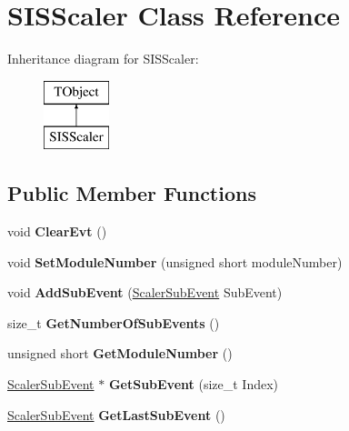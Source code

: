 \hypertarget{class_s_i_s_scaler}{}\section{S\+I\+S\+Scaler Class Reference}
\label{class_s_i_s_scaler}
Inheritance diagram for S\+I\+S\+Scaler\+:\begin{figure}[H]
\begin{center}
\leavevmode
\includegraphics[height=2.000000cm]{class_s_i_s_scaler}
\end{center}
\end{figure}
\subsection*{Public Member Functions}
\begin{DoxyCompactItemize}
\item 
\mbox{\label{class_s_i_s_scaler_a1038e9479e85008d7283bb10d3a0ea52}} 
void {\bfseries Clear\+Evt} ()
\item 
\mbox{\label{class_s_i_s_scaler_a19a3c1b9b24d6dd3f359c25749cca97b}} 
void {\bfseries Set\+Module\+Number} (unsigned short module\+Number)
\item 
\mbox{\label{class_s_i_s_scaler_acd7452d99f825be03e150ca7095e81f2}} 
void {\bfseries Add\+Sub\+Event} (\hyperlink{class_scaler_sub_event}{Scaler\+Sub\+Event} Sub\+Event)
\item 
\mbox{\label{class_s_i_s_scaler_aa0fc0b485191e72ef46ed4fccb9525e1}} 
size\+\_\+t {\bfseries Get\+Number\+Of\+Sub\+Events} ()
\item 
\mbox{\label{class_s_i_s_scaler_aa3c573faebe1e226c94834515f94cfe4}} 
unsigned short {\bfseries Get\+Module\+Number} ()
\item 
\mbox{\label{class_s_i_s_scaler_a8596170dd427752af3c9e2343971e07c}} 
\hyperlink{class_scaler_sub_event}{Scaler\+Sub\+Event} $\ast$ {\bfseries Get\+Sub\+Event} (size\+\_\+t Index)
\item 
\mbox{\label{class_s_i_s_scaler_a2fc33da7a9676cc15912ead53f72ff06}} 
\hyperlink{class_scaler_sub_event}{Scaler\+Sub\+Event} {\bfseries Get\+Last\+Sub\+Event} ()
\end{DoxyCompactItemize}

